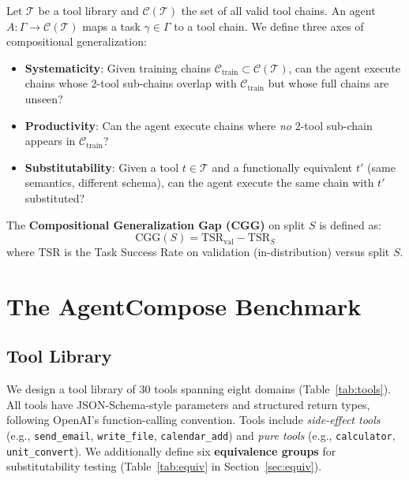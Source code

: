 ﻿\documentclass{article}
\begin{document}
Let $\mathcal{T}$ be a tool library and $\mathcal{C}(\mathcal{T})$ the set of all valid tool chains. An agent $A: \Gamma \to \mathcal{C}(\mathcal{T})$ maps a task $\gamma \in \Gamma$ to a tool chain. We define three axes of compositional generalization:

\begin{itemize}
    \item \textbf{Systematicity}: Given training chains $\mathcal{C}_{\text{train}} \subset \mathcal{C}(\mathcal{T})$, can the agent execute chains whose 2-tool sub-chains overlap with $\mathcal{C}_{\text{train}}$ but whose full chains are unseen?
    \item \textbf{Productivity}: Can the agent execute chains where \emph{no} 2-tool sub-chain appears in $\mathcal{C}_{\text{train}}$?
    \item \textbf{Substitutability}: Given a tool $t \in \mathcal{T}$ and a functionally equivalent $t'$ (same semantics, different schema), can the agent execute the same chain with $t'$ substituted?
\end{itemize}

The {\bf Compositional Generalization Gap (CGG)} on split $S$ is defined as:
\begin{equation}
\text{CGG}(S) = \text{TSR}_{\text{val}} - \text{TSR}_{S}
\end{equation}
where TSR is the Task Success Rate on validation (in-distribution) versus split $S$.

\section{The AgentCompose Benchmark}
\label{sec:benchmark}

\subsection{Tool Library}

We design a tool library of 30 tools spanning eight domains (Table~\ref{tab:tools}). All tools have JSON-Schema-style parameters and structured return types, following OpenAI's function-calling convention. Tools include \emph{side-effect tools} (e.g., \texttt{send\_email}, \texttt{write\_file}, \texttt{calendar\_add}) and \emph{pure tools} (e.g., \texttt{calculator}, \texttt{unit\_convert}). We additionally define six {\bf equivalence groups} for substitutability testing (Table~\ref{tab:equiv} in Section~\ref{sec:equiv}).
\end{document}

